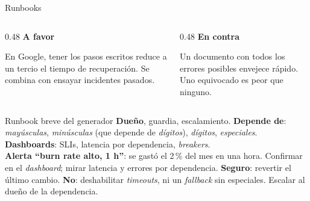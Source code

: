 \documentclass[institutional,screen,none]{ua-engineering-v6-beamer}
\begin{document}
\begin{frame}{Runbooks}
\begin{columns}[T,onlytextwidth]
\begin{column}{0.48\textwidth}
\textbf{A favor}

{\small En Google, tener los pasos escritos reduce a un tercio el tiempo de recuperación. Se combina con ensayar incidentes pasados.}
\end{column}
\begin{column}{0.48\textwidth}
\textbf{En contra}

{\small Un documento con todos los errores posibles envejece rápido. Uno equivocado es peor que ninguno.}
\end{column}
\end{columns}

\pause

\vspace{0.4em}
\begin{block}{Runbook breve del generador}
\scriptsize
\textbf{Dueño}, guardia, escalamiento. \textbf{Depende de}: \emph{mayúsculas}, \emph{minúsculas} (que depende de \emph{dígitos}), \emph{dígitos}, \emph{especiales}. \textbf{Dashboards}: SLIs, latencia por dependencia, \emph{breakers}.\\[3pt]
\textbf{Alerta ``burn rate alto, 1 h''}: se gastó el 2\,\% del mes en una hora. Confirmar en el \emph{dashboard}; mirar latencia y errores por dependencia. \textbf{Seguro}: revertir el último cambio. \textbf{No}: deshabilitar \emph{timeouts}, ni un \emph{fallback} sin especiales. Escalar al dueño de la dependencia.
\end{block}
\end{frame}

\end{document}
